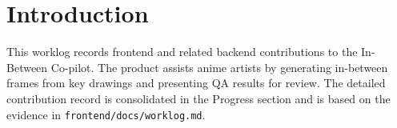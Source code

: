 \section{Introduction}
This worklog records frontend and related backend contributions to the In-Between Co-pilot. The product assists anime artists by generating in-between frames from key drawings and presenting QA results for review. The detailed contribution record is consolidated in the Progress section and is based on the evidence in \texttt{frontend/docs/worklog.md}.
